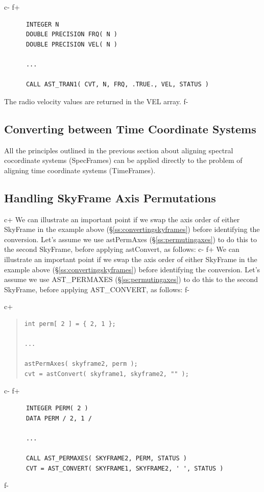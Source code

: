 \documentclass[twoside,11pt]{article}
\newcommand{\secref}[1]{\S\ref{#1}}
\newcommand{\secref}[1]{\ref{#1}}
\begin{document}
c-
f+
\small
\begin{verbatim}
      INTEGER N
      DOUBLE PRECISION FRQ( N )
      DOUBLE PRECISION VEL( N )

      ...

      CALL AST_TRAN1( CVT, N, FRQ, .TRUE., VEL, STATUS )
\end{verbatim}
\normalsize

The radio velocity values are returned in the VEL array.
f-

\subsection{Converting between Time Coordinate Systems}
All the principles outlined in the previous section about aligning
spectral cocordinate systems (SpecFrames) can be applied directly to the
problem of aligning time coordinate systems (TimeFrames).

\subsection{\label{ss:convertingpermutedaxes}Handling SkyFrame Axis Permutations}

c+
We can illustrate an important point if we swap the axis order of
either SkyFrame in the example above (\secref{ss:convertingskyframes})
before identifying the conversion. Let's assume we use astPermAxes
(\secref{ss:permutingaxes}) to do this to the second SkyFrame, before
applying astConvert, as follows:
c-
f+
We can illustrate an important point if we swap the axis order of
either SkyFrame in the example above (\secref{ss:convertingskyframes})
before identifying the conversion. Let's assume we use AST\_PERMAXES
(\secref{ss:permutingaxes}) to do this to the second SkyFrame, before
applying AST\_CONVERT, as follows:
f-

c+
\begin{quote}
\small
\begin{verbatim}
int perm[ 2 ] = { 2, 1 };

...

astPermAxes( skyframe2, perm );
cvt = astConvert( skyframe1, skyframe2, "" );
\end{verbatim}
\normalsize
\end{quote}
c-
f+
\small
\begin{verbatim}
      INTEGER PERM( 2 )
      DATA PERM / 2, 1 /

      ...

      CALL AST_PERMAXES( SKYFRAME2, PERM, STATUS )
      CVT = AST_CONVERT( SKYFRAME1, SKYFRAME2, ' ', STATUS )
\end{verbatim}
\normalsize
f-
\end{document}
